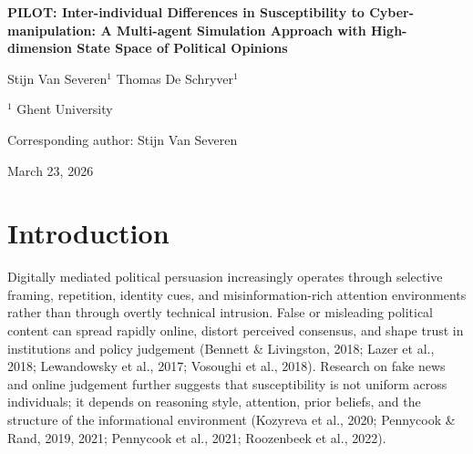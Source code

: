 \documentclass[11pt]{article}
\begin{document}
\begin{center}
{\LARGE\bfseries PILOT: Inter-individual Differences in Susceptibility to Cyber-manipulation: A Multi-agent Simulation Approach with High-dimension State Space of Political Opinions\par}
\vspace{0.9em}
{\large Stijn Van Severen$^1$ \quad\textbullet\quad Thomas De Schryver$^1$\par}
\vspace{0.45em}
{\normalsize $^1$ Ghent University\par}
{\normalsize Corresponding author: Stijn Van Severen\par}
\vspace{0.35em}
{\normalsize March 23, 2026\par}
\end{center}

\begin{abstract}
This pilot study examines whether inter-individual differences moderate susceptibility to cyber-manipulation in a high-dimensional political opinion state space. Rather than estimating a no-attack counterfactual, run\_5 focuses on a narrower and methodologically cleaner question: among attacked individuals, which profile differences predict larger post-minus-baseline opinion shifts after exposure to a common adversarial misinformation vector? Using ontology-constrained scenario generation, repeated opinion leaves, structured large-language-model agents, and audited realism/coherence checks, the pipeline generated 20 attacked scenarios across 4 repeated opinion leaves in Defense\_and\_National\_Security. The attacked sample showed a mean opinion delta of 26.6 (SD = 35.0), with mean attack realism 0.70 and mean post-exposure plausibility 0.62. In the primary robust delta model, the coefficient for the pre-registered susceptibility moderator was -16.97 (p = 0.010; bootstrap 95\% CI [-29.78, -1.03]). The attack-only design directly matches the moderation question but does not estimate absolute attack-versus-no-attack effects. Findings are therefore methodological and exploratory rather than claim-ready evidence about real-world populations.
\end{abstract}

\section{Introduction}
Digitally mediated political persuasion increasingly operates through selective framing, repetition, identity cues, and misinformation-rich attention environments rather than through overtly technical intrusion. False or misleading political content can spread rapidly online, distort perceived consensus, and shape trust in institutions and policy judgement (Bennett \& Livingston, 2018; Lazer et al., 2018; Lewandowsky et al., 2017; Vosoughi et al., 2018). Research on fake news and online judgement further suggests that susceptibility is not uniform across individuals; it depends on reasoning style, attention, prior beliefs, and the structure of the informational environment (Kozyreva et al., 2020; Pennycook \& Rand, 2019, 2021; Pennycook et al., 2021; Roozenbeek et al., 2022).
\end{document}
